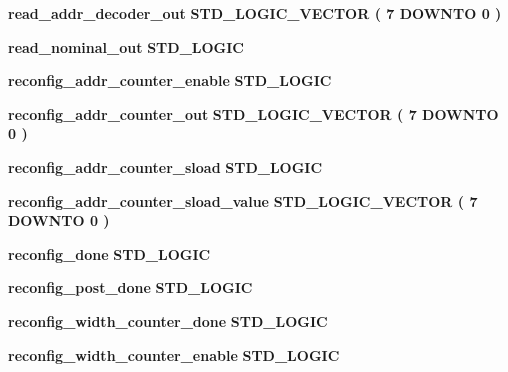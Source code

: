 \begin{DoxyCompactItemize}
\item 
{\bf read\+\_\+addr\+\_\+decoder\+\_\+out} {\bfseries \textcolor{comment}{S\+T\+D\+\_\+\+L\+O\+G\+I\+C\+\_\+\+V\+E\+C\+T\+OR}\textcolor{vhdlchar}{ }\textcolor{vhdlchar}{(}\textcolor{vhdlchar}{ }\textcolor{vhdlchar}{ } \textcolor{vhdldigit}{7} \textcolor{vhdlchar}{ }\textcolor{keywordflow}{D\+O\+W\+N\+TO}\textcolor{vhdlchar}{ }\textcolor{vhdlchar}{ } \textcolor{vhdldigit}{0} \textcolor{vhdlchar}{ }\textcolor{vhdlchar}{)}\textcolor{vhdlchar}{ }} 
\item 
{\bf read\+\_\+nominal\+\_\+out} {\bfseries \textcolor{comment}{S\+T\+D\+\_\+\+L\+O\+G\+IC}\textcolor{vhdlchar}{ }} 
\item 
{\bf reconfig\+\_\+addr\+\_\+counter\+\_\+enable} {\bfseries \textcolor{comment}{S\+T\+D\+\_\+\+L\+O\+G\+IC}\textcolor{vhdlchar}{ }} 
\item 
{\bf reconfig\+\_\+addr\+\_\+counter\+\_\+out} {\bfseries \textcolor{comment}{S\+T\+D\+\_\+\+L\+O\+G\+I\+C\+\_\+\+V\+E\+C\+T\+OR}\textcolor{vhdlchar}{ }\textcolor{vhdlchar}{(}\textcolor{vhdlchar}{ }\textcolor{vhdlchar}{ } \textcolor{vhdldigit}{7} \textcolor{vhdlchar}{ }\textcolor{keywordflow}{D\+O\+W\+N\+TO}\textcolor{vhdlchar}{ }\textcolor{vhdlchar}{ } \textcolor{vhdldigit}{0} \textcolor{vhdlchar}{ }\textcolor{vhdlchar}{)}\textcolor{vhdlchar}{ }} 
\item 
{\bf reconfig\+\_\+addr\+\_\+counter\+\_\+sload} {\bfseries \textcolor{comment}{S\+T\+D\+\_\+\+L\+O\+G\+IC}\textcolor{vhdlchar}{ }} 
\item 
{\bf reconfig\+\_\+addr\+\_\+counter\+\_\+sload\+\_\+value} {\bfseries \textcolor{comment}{S\+T\+D\+\_\+\+L\+O\+G\+I\+C\+\_\+\+V\+E\+C\+T\+OR}\textcolor{vhdlchar}{ }\textcolor{vhdlchar}{(}\textcolor{vhdlchar}{ }\textcolor{vhdlchar}{ } \textcolor{vhdldigit}{7} \textcolor{vhdlchar}{ }\textcolor{keywordflow}{D\+O\+W\+N\+TO}\textcolor{vhdlchar}{ }\textcolor{vhdlchar}{ } \textcolor{vhdldigit}{0} \textcolor{vhdlchar}{ }\textcolor{vhdlchar}{)}\textcolor{vhdlchar}{ }} 
\item 
{\bf reconfig\+\_\+done} {\bfseries \textcolor{comment}{S\+T\+D\+\_\+\+L\+O\+G\+IC}\textcolor{vhdlchar}{ }} 
\item 
{\bf reconfig\+\_\+post\+\_\+done} {\bfseries \textcolor{comment}{S\+T\+D\+\_\+\+L\+O\+G\+IC}\textcolor{vhdlchar}{ }} 
\item 
{\bf reconfig\+\_\+width\+\_\+counter\+\_\+done} {\bfseries \textcolor{comment}{S\+T\+D\+\_\+\+L\+O\+G\+IC}\textcolor{vhdlchar}{ }} 
\item 
{\bf reconfig\+\_\+width\+\_\+counter\+\_\+enable} {\bfseries \textcolor{comment}{S\+T\+D\+\_\+\+L\+O\+G\+IC}\textcolor{vhdlchar}{ }} 

\end{DoxyCompactItemize}
